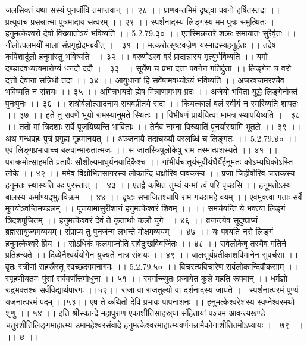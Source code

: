 जलसिक्तं यथा सस्यं पुनर्जीवि तमाप्तवान् ।। २८ ।।
प्राणवन्तमिमं दृष्ट्वा पवनो हर्षितस्तदा ।।
प्रत्युवाच प्रसन्नात्मा पुत्रमादाय सत्वरम् ।। २९ ।।
स्पर्शनादस्य लिङ्गस्य मम पुत्रः समुत्थितः ।।
हनुमत्केश्वरो देवो विख्यातोऽयं भविष्यति ।। 5.2.79.३० ।।
एतस्मिन्नन्तरे शक्रः समायातः सुरैर्वृतः ।।
नीलोत्पलमयीं मालां संप्रगृह्येदमब्रवीत् ।। ३१ ।।
मत्करोत्सृष्टवज्रेण यस्मादस्यहनुर्हतः ।।
तदेष कपिशार्दूलो हनुमांस्तु भविष्यति ।। ३२ ।।
वरुणोऽस्व वरं प्रादान्नास्य मृत्युर्भविष्यति ।।
यमो दण्डादवध्यत्वमारोग्यं धनदो ददौ ।। ३३ ।।
सूर्येण च प्रभा दत्ता पवनेन गतिर्द्रुता ।।
लिङ्गेन च वरो दत्तो देवानां सन्निधौ तदा ।। ३४ ।।
आयुधानां हि सर्वेषामवध्योऽयं भविष्यति ।।
अजरश्चामरश्चैव भविष्यति न संशयः ।। ३५ ।।
अमित्रभयदो ह्येष मित्राणामभय प्रदः ।।
अजेयो भविता युद्धे लिङ्गेनोक्तं पुनःपुनः ।। ३६ ।।
शत्रोर्बलोत्सादनाय राघवप्रीतये सदा ।।
कियत्कालं बलं स्वीयं न स्मरिष्यति शापतः ।। ३७ ।।
हते तु रावणे भूयो रामस्यानुमते स्थितः ।।
विभीषणं प्रार्थयित्वा मामत्र स्थापयिष्यति ।। ३८ ।।
ततो मां त्रिदशाः सर्वे पूजयिष्यन्ति भाविताः ।।
तेनैव नाम्ना विख्यातिं पुनर्यास्यामि भूतले ।। ३९ ।।
अथ गन्धवहः पुत्रं प्रगृह्य गृहमानयत् ।।
अञ्जनायै तदाचख्यौ वरलब्धिं च लिङ्गतः ।। 5.2.79.४० ।।
एवं लिङ्गप्रभावाच्च बलवान्मारुतात्मजः ।।
स जातस्त्रिषुलोकेषु राम तस्मात्प्रशस्यते ।। ४१ ।।
पराक्रमोत्साहमति प्रतापैः सौशील्यमाधुर्यनयादिकैश्च ।।
गांभीर्यचातुर्यसुवीर्यधैर्यैर्हनूमतः कोऽभ्यधिकोऽस्ति लोके ।। ४२ ।।
ममेव विक्षोभितसागरस्य लोकान्दि धक्षोरिव पावकस्य ।।
प्रजा जिहीर्षोरिव चातकस्य हनूमतः स्थास्यति कः पुरस्तात् ।। ४३ ।।
एतद्वै कथित तुभ्यं यन्मां त्वं परि पृच्छसि ।।
हनूमतोऽस्य बालस्य कर्माण्यद्भुतविक्रम ।। ४४ ।।
दृष्टः सभाजितश्चापि राम गच्छामहे वयम् ।।
एवमुक्त्वा गताः सर्वे मुनयोऽवन्तिमण्डलम् ।।
पूजयामासुरीशानं हनुमत्केश्वरं शिवम् ।। ।।
समर्चयन्ति ये भक्त्या लिङ्गं त्रिदशपूजितम् ।।
हनुमत्केश्वरं देवं ते कृतार्थाः कलौ युगे ।। ४६ ।।
व्रजन्त्येव सुदुष्प्राप्यं ब्रह्मसायुज्यमव्ययम्।
संप्राप्य तु पुनर्जन्म लभन्ते मोक्षमव्ययम् ।। ४७ ।।
यः पश्यति नरो लिङ्गं हनुमत्केश्वरॆ प्रिय ।।
सोऽधिकं फलमाप्नोति सर्वदुःखविवर्जितः ।। ४८ ।।
सर्वलोकेषु तस्यैव गतिर्न प्रतिहन्यते ।।
दिव्येनैश्वर्ययोगेन युज्यते नात्र संशयः ।। ४९ ।।
बालसूर्यप्रतीकाशविमानेन सुवर्चसा ।।
वृतः स्त्रीणां सहस्रैस्तु स्वच्छदगमनागमः ।। 5.2.79.५० ।।
विचरत्यविचारेण सर्वलोकान्दिवौकसाम् ।।
स्पृहणीयतमः पुंसां सर्ववर्णोत्तमोधुना ।। ५१ ।।
स्वर्गाच्च्युतः प्रजायेत कुले महति रूपवान् ।।
धर्मज्ञो रुद्रभक्तश्च सर्वविद्यार्थपारगः ।।५२।।
राजा वा राजतुल्यो वा दर्शनादस्य जायते ।।
स्पर्शनात्परमं पुण्यं यजनात्परमं पदम् ।।५३।।
एष ते कथितो देवि प्रभावः पापनाशनः ।।
हनुमत्केश्वरेशस्य स्वप्नेश्वरमथो शृणु ।। ५४ ।।
इति श्रीस्कान्दे महापुराण एकाशीतिसाहस्र्यां संहितायां पञ्चम आवन्त्यखण्डे चतुरशीतिलिङ्गमाहात्म्य उमामहेश्वरसंवादे हनुमत्केश्वरमाहात्म्यवर्णनन्नामैकोनाशीतितमोऽध्यायः ।। ७९ ।। ।। छ ।।

